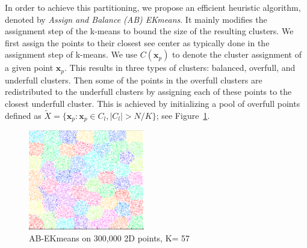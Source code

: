In order to achieve this partitioning, we propose an efficient heuristic algorithm, denoted by {\em Assign and Balance (AB) EKmeans}. It mainly modifies the assignment step of the k-means to bound the size of the resulting clusters. We first assign the points to their closest see center as typically done in the assignment step of k-means. We use $C(\mathbf{x}_p)$ to denote the cluster assignment of a given point $\mathbf{x}_p$. This results in three types of clusters: balanced, overfull, and underfull clusters. Then some of  the points in the overfull clusters are redistributed to the underfull clusters by assigning each of these points to the closest underfull cluster.  This is achieved by initializing a pool of overfull points defined as $ \tilde{X}  = \{\mathbf{x}_p : \mathbf{x}_p \in C_l , |C_l| > N/K \}$; see Figure~\ref{figABkmeans57}.

\begin{figure}[t!]
\includegraphics[width=0.45\textwidth]{Ekmeans57.png}
\caption{AB-EKmeans on 300,000 2D points, K= 57}
\label{figABkmeans57}
\end{figure}

